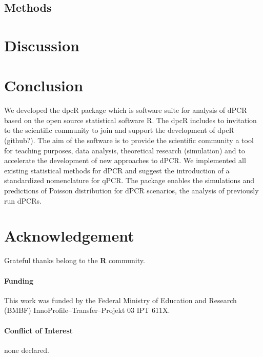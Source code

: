 \documentclass{bioinfo}
\begin{document}
\begin{methods}
\section{Methods}



\end{methods}


\section{Discussion}





%
%






\section{Conclusion}

We developed the dpcR package which is software suite for analysis of dPCR based 
on the open source statistical software R. The dpcR includes to invitation to 
the scientific community to join and support the development of dpcR (github?). 
The aim of the software is to provide the scientific community a tool for 
teaching purposes, data analysis, theoretical research (simulation) and to 
accelerate the development of new approaches to dPCR. We implemented all 
existing statistical methods for dPCR and suggest the introduction of a 
standardized nomenclature for qPCR. The package enables the simulations and 
predictions of Poisson distribution for dPCR scenarios, the analysis of 
previously run dPCRs.

\section*{Acknowledgement}

Grateful thanks belong to the \textbf{R} community.

\paragraph{Funding\textcolon} This work was funded by the Federal Ministry of Education and Research (BMBF)
 InnoProfile--Transfer--Projekt 03 IPT 611X.

\paragraph{Conflict of Interest\textcolon} none declared.

%
%
%
%
%
%

%

\end{document}
